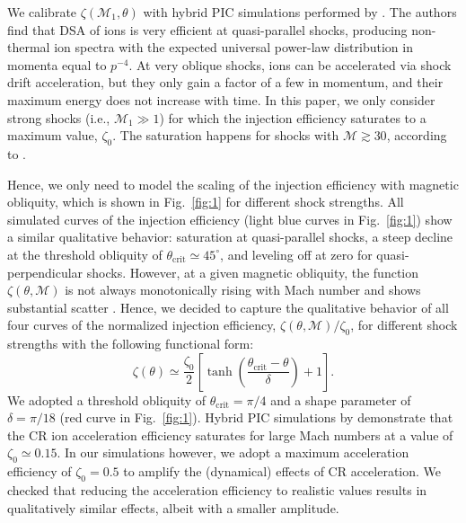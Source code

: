 \documentclass[8pt,a4paper,usenatbib]{mnras}
\newcommand{\mach}{\mathcal{M}}
\begin{document}
We calibrate $\zeta(\mach_1, \theta)$ with hybrid PIC simulations performed by
\citet{2014ApJ...783...91C}. The authors find that DSA of ions is very efficient
at quasi-parallel shocks, producing non-thermal ion spectra with the expected
universal power-law distribution in momenta equal to $p^{-4}$. At very oblique
shocks, ions can be accelerated via shock drift acceleration, but they only gain
a factor of a few in momentum, and their maximum energy does not increase with
time. In this paper, we only consider strong shocks (i.e., $\mach_1 \gg 1$) for
which the injection efficiency saturates to a maximum value, $\zeta_0$. The
saturation happens for shocks with $\mach \gtrsim 30$, according to
\citet{2013ApJ...764...95K}.

Hence, we only need to model the scaling of the injection efficiency with
magnetic obliquity, which is shown in Fig.~\ref{fig:1} for different shock
strengths. All simulated curves of the injection efficiency (light blue curves
in Fig.~\ref{fig:1}) show a similar qualitative behavior: saturation at
quasi-parallel shocks, a steep decline at the threshold obliquity of
$\theta_{\mathrm{crit}}\simeq45^\circ$, and leveling off at zero for
quasi-perpendicular shocks.  However, at a given magnetic obliquity, the
function $\zeta(\theta,\mach)$ is not always monotonically rising with Mach
number and shows substantial scatter \citep[see Fig.~3
  of][]{2014ApJ...783...91C}. Hence, we decided to capture the qualitative
behavior of all four curves of the normalized injection efficiency,
$\zeta(\theta,\mach)/\zeta_0$, for different shock strengths with the following
functional form:
\begin{equation}
  \label{eq:efficiency}
  \zeta(\theta) \simeq \dfrac{\zeta_0}{2}
  \left[ \tanh\left( \dfrac{\theta_{\mathrm{crit}}-\theta}{\delta} \right) + 1 \right].
\end{equation}
We adopted a threshold obliquity of $\theta_{\mathrm{crit}}=\pi/4$ and a shape
parameter of $\delta = \pi/18$ (red curve in Fig.~\ref{fig:1}).  Hybrid PIC
simulations by \citet{2014ApJ...783...91C} demonstrate that the CR ion
acceleration efficiency saturates for large Mach numbers at a value of
$\zeta_0\simeq0.15$. In our simulations however, we adopt a maximum acceleration
efficiency of $\zeta_0=0.5$ to amplify the (dynamical) effects of CR
acceleration. We checked that reducing the acceleration efficiency to realistic
values results in qualitatively similar effects, albeit with a smaller amplitude. 
\end{document}
